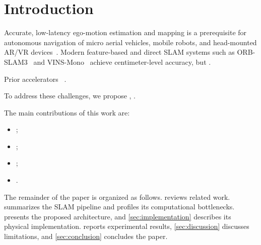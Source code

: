 \section{Introduction}
\label{sec:intro}

Accurate, low-latency ego-motion estimation and mapping is a prerequisite for
autonomous navigation of micro aerial vehicles, mobile robots, and
head-mounted AR/VR devices~\cite{cadena2016past}.
Modern feature-based and direct SLAM systems such as
ORB-SLAM3~\cite{campos2021orbslam3} and VINS-Mono~\cite{qin2018vins}
achieve centimeter-level accuracy, but .

Prior accelerators~\cite{suleiman2019navion,li2019cnn_slam_asic}
.

To address these challenges, we propose \sysname, .

The main contributions of this work are:
\begin{itemize}
  \item {};
  \item {};
  \item {};
  \item {}.
\end{itemize}

The remainder of the paper is organized as follows.
 reviews related work.
 summarizes the SLAM pipeline and profiles its
computational bottlenecks.
 presents the proposed architecture, and
\cref{sec:implementation} describes its physical implementation.
 reports experimental results,
\cref{sec:discussion} discusses limitations, and
\cref{sec:conclusion} concludes the paper.
